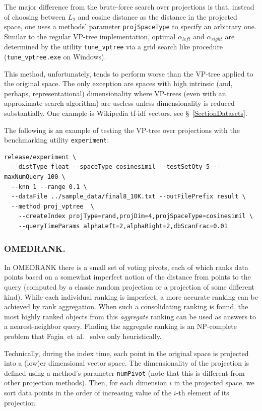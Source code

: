 \documentclass[runningheads,a4paper]{llncs}
\newcommand{\ttt}[1]{\texttt{#1}}
\begin{document}
{The major difference from the brute-force search over projections is that, instead of choosing between $L_2$ and cosine distance as the distance
in the projected space, one uses a methods' parameter \ttt{projSpaceType} to specify an arbitrary one.
Similar to the regular VP-tree implementation,
optimal $\alpha_{left}$ and $\alpha_{right}$ are determined by the utility \ttt{tune\_vptree} via a grid search like procedure (\ttt{tune\_vptree.exe} on Windows). 

This method, unfortunately, tends to perform worse than the VP-tree applied to the original space. 
The only exception are spaces with high intrinsic (and, perhaps, representational) dimensionality
where VP-trees (even with an approximate search algorithm) are useless unless dimensionality is reduced substantially.
One example is Wikipedia tf-idf vectors, see \S~\ref{SectionDatasets}.

The following is an example of testing the VP-tree over projections with the benchmarking utility \ttt{experiment}:
{
\footnotesize
\begin{verbatim}
release/experiment \
  --distType float --spaceType cosinesimil --testSetQty 5 --maxNumQuery 100 \
  --knn 1 --range 0.1 \
  --dataFile ../sample_data/final8_10K.txt --outFilePrefix result \
  --method proj_vptree  \
    --createIndex projType=rand,projDim=4,projSpaceType=cosinesimil \
    --queryTimeParams alphaLeft=2,alphaRight=2,dbScanFrac=0.01
\end{verbatim}
}

\subsubsection{\textbf{OMEDRANK}.}\label{SectionOmedrank}
In OMEDRANK \cite{Fagin2003} there is a small set of voting pivots,
each of which ranks data points based on a somewhat imperfect notion of the distance from points to the query (computed
by a classic random projection or a projection of some different kind).
While each individual ranking is imperfect,
a more accurate ranking can be achieved by rank aggregation. 
When such a consolidating ranking is found, the most highly ranked objects from this
\emph{aggregate} ranking can be used as answers to a nearest-neighbor query.
Finding the aggregate ranking is an NP-complete problem that Fagin~et~al.~\cite{Fagin2003} solve only heuristically.

Technically, during the index time, each point in the original space is projected into a (low)er dimensional
vector space. The dimensionality of the projection is defined using a method's parameter  \ttt{numPivot}
(note that this is different from other projection methods).
Then, for each dimension $i$ in the projected space, we sort data points in the order of increasing value of
the \mbox{$i$-th} element of its projection.

}
\end{document}

